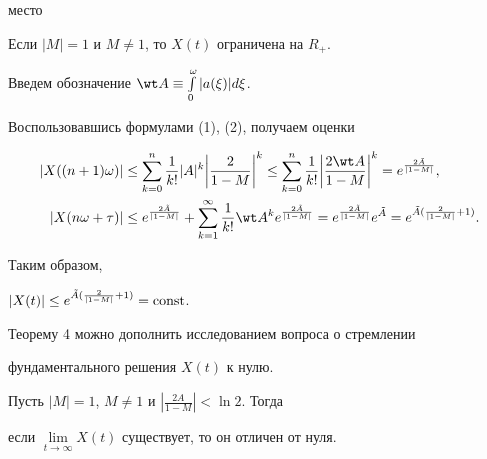 место 


 


\begin{thm} 


Если $|M|=1$ и $M\ne1$, то $X(t)$ ограничена на $R_+$. 


\end{thm} 


 


\begin{pf} 


Введем обозначение $\wt A\equiv\int\limits^\omega_0 |a(\xi)|d\xi$. 


Воспользовавшись формулами (1), (2), получаем оценки 


\begin{align*} 


|X((n+1)\omega)|&\le\sum^n_{k=0}\frac{1}{k!}|A|^k\bigg| 


\frac{2}{1-M}\bigg|^k\le\sum^n_{k=0}\frac{1}{k!} 


\bigg|\frac{2\wt A}{1-M}\bigg|^k=e^{\frac{2\Tilde A}{|1-M|}}, \\ 


% 


|X(n\omega+\tau)|&\le e^{\frac{2\Tilde A}{|1-M|}}+ 


\sum^\infty_{k=1}\frac{1}{k!}\wt A{}^k 


e^{\frac{2\Tilde A}{|1-M|}}=e^{\frac{2\Tilde A}{|1-M|}} 


e^{\Tilde A}=e^{\Tilde A(\frac{2}{|1-M|}+1)}.


\end{align*} 


Таким образом, 


$|X(t)|\le e^{\Tilde A(\frac{2}{|1-M|}+1)}=\operatorname{const}$. 


\end{pf} 


 


Теорему 4 можно дополнить исследованием вопроса о стремлении 


фундаментального решения $X(t)$ к нулю. 


 


\begin{thm} 


Пусть $|M|=1$, $M\ne1$ и $|\frac{2A}{1-M}|<\ln2$. Тогда 


если $\lim\limits_{t\to\infty}X(t)$ существует, то он отличен от нуля. 


\end{thm} 



